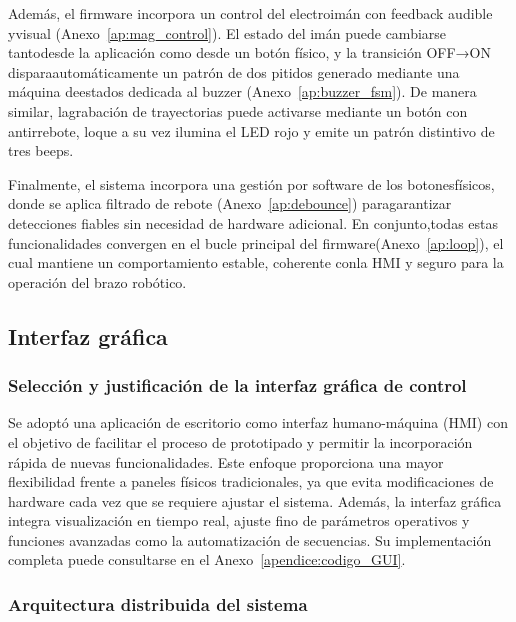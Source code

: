 Además, el firmware incorpora un control del electroimán con feedback audible yvisual (Anexo~\ref{ap:mag_control}). El estado del imán puede cambiarse tantodesde la aplicación como desde un botón físico, y la transición OFF→ON disparaautomáticamente un patrón de dos pitidos generado mediante una máquina deestados dedicada al buzzer (Anexo~\ref{ap:buzzer_fsm}). De manera similar, lagrabación de trayectorias puede activarse mediante un botón con antirrebote, loque a su vez ilumina el LED rojo y emite un patrón distintivo de tres beeps.

\vspace{1em}

Finalmente, el sistema incorpora una gestión por software de los botonesfísicos, donde se aplica filtrado de rebote (Anexo~\ref{ap:debounce}) paragarantizar detecciones fiables sin necesidad de hardware adicional. En conjunto,todas estas funcionalidades convergen en el bucle principal del firmware(Anexo~\ref{ap:loop}), el cual mantiene un comportamiento estable, coherente conla HMI y seguro para la operación del brazo robótico.






\subsection{Interfaz gráfica}

\subsubsection{Selección y justificación de la interfaz gráfica de control}

Se adoptó una aplicación de escritorio como interfaz humano-máquina (HMI) con el objetivo de facilitar el proceso de prototipado y permitir la incorporación rápida de nuevas funcionalidades. Este enfoque proporciona una mayor flexibilidad frente a paneles físicos tradicionales, ya que evita modificaciones de hardware cada vez que se requiere ajustar el sistema. Además, la interfaz gráfica integra visualización en tiempo real, ajuste fino de parámetros operativos y funciones avanzadas como la automatización de secuencias. Su implementación completa puede consultarse en el Anexo~\ref{apendice:codigo_GUI}.

\subsubsection{Arquitectura distribuida del sistema}

